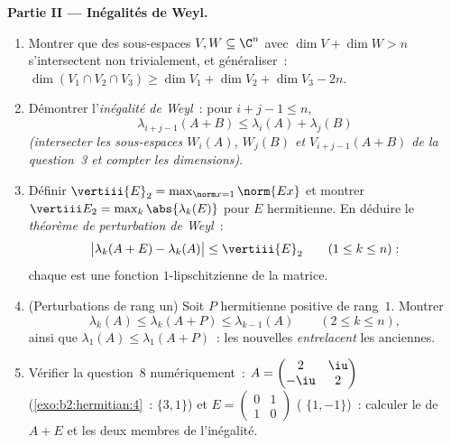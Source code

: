\begin{problem}
\medskip
\noindent\textbf{Partie II --- Inégalités de Weyl.}
\begin{enumerate}[resume]
  \item Montrer que des sous-espaces $V, W \subseteq \C^n$ avec $\dim V
        + \dim W > n$ s'intersectent non trivialement, et généraliser~:
        $\dim(V_1 \cap V_2 \cap V_3) \geq \dim V_1 + \dim V_2 +
        \dim V_3 - 2n$.
  \item Démontrer l'\emph{inégalité de Weyl}~: pour $i + j - 1 \leq n$,
        \[
        \lambda_{i+j-1}(A + B) \leq \lambda_i(A) +
        \lambda_j(B)
        \]
        \emph{(intersecter les sous-espaces $W_i(A)$, $W_j(B)$ et
        $V_{i+j-1}(A+B)$ de la question~3 et compter les
        dimensions)}.
  \item Définir $\vertiii{E}_2 = \max_{\norm x = 1}\norm{Ex}$
        et montrer $\vertiii E_2 = \max_k\abs{\lambda_k(E)}$ pour
        $E$ hermitienne. En déduire le \emph{théorème de perturbation
        de Weyl}~:
        \[
        \bigl|\lambda_k(A + E) - \lambda_k(A)\bigr| \leq
        \vertiii{E}_2
        \qquad (1 \leq k \leq n) :
        \]
        chaque  est une fonction $1$-lipschitzienne de la
        matrice.
  \item (Perturbations de rang un) Soit $P$ hermitienne positive
        de rang~$1$. Montrer
        \[
        \lambda_k(A) \leq \lambda_k(A + P) \leq
        \lambda_{k-1}(A) \qquad (2 \leq k \leq n),
        \]
        ainsi que $\lambda_1(A) \leq \lambda_1(A+P)$~: les
        nouvelles  \emph{entrelacent} les anciennes.
  \item Vérifier la question~8 numériquement~: $A = \begin{pmatrix} 2 &
        \iu\\ -\iu & 2\end{pmatrix}$
        (\cref{exo:b2:hermitian:4}~:  $\{3, 1\}$) et
        $E = \begin{pmatrix} 0 & 1\\ 1 & 0\end{pmatrix}$
        ( $\{1, -1\}$)~: calculer le  de $A +
        E$ et les deux membres de l'inégalité.
\end{enumerate}


\end{problem}
